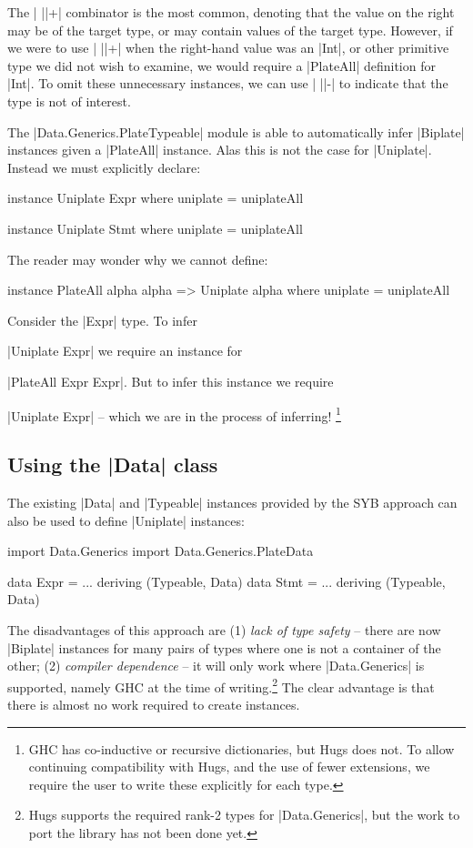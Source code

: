 The | ||+| combinator is the most common, denoting that the value on the right may be of the target type, or may contain values of the target type. However, if we were to use | ||+| when the right-hand value was an |Int|, or other primitive type we did not wish to examine, we would require a |PlateAll| definition for |Int|. To omit these unnecessary instances, we can use | ||-| to indicate that the type is not of interest.

The |Data.Generics.PlateTypeable| module is able to automatically infer |Biplate| instances given a |PlateAll| instance. Alas this is not the case for |Uniplate|. Instead we must explicitly declare:

\begin{code}
instance Uniplate Expr where
    uniplate = uniplateAll

instance Uniplate Stmt where
    uniplate = uniplateAll
\end{code}

The reader may wonder why we cannot define:

\begin{code}
instance PlateAll alpha alpha => Uniplate alpha where
    uniplate = uniplateAll
\end{code}

Consider the |Expr| type. To infer \ignore|Uniplate Expr| we require an instance for \ignore|PlateAll Expr Expr|. But to infer this instance we require \ignore|Uniplate Expr| -- which we are in the process of inferring! \footnote{GHC has co-inductive or recursive dictionaries, but Hugs does not. To allow continuing compatibility with Hugs, and the use of fewer extensions, we require the user to write these explicitly for each type.}


\subsection{Using the |Data| class}
\label{sec:implement_playdata}

The existing |Data| and |Typeable| instances provided by the SYB approach can also be used to define |Uniplate| instances:

\ignore\begin{code}
import Data.Generics
import Data.Generics.PlateData

data Expr  = ... \? \? deriving (Typeable, Data)
data Stmt  = ... \? \? deriving (Typeable, Data)
\end{code}

The disadvantages of this approach are (1) \textit{lack of type safety} -- there are now |Biplate| instances for many pairs of types where one is not a container of the other; (2) \textit{compiler dependence} -- it will only work where |Data.Generics| is supported, namely GHC at the time of writing.\footnote{Hugs supports the required rank-2 types for |Data.Generics|, but the work to port the library has not been done yet.} The clear advantage is that there is almost no work required to create instances.

